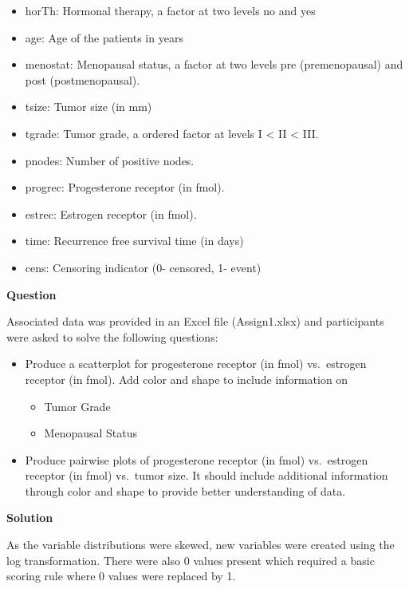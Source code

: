 \begin{itemize}
\tightlist
\item
  horTh: Hormonal therapy, a factor at two levels no and yes
\item
  age: Age of the patients in years
\item
  menostat: Menopausal status, a factor at two levels pre
  (premenopausal) and post (postmenopausal).
\item
  tsize: Tumor size (in mm)
\item
  tgrade: Tumor grade, a ordered factor at levels I \textless{} II
  \textless{} III.
\item
  pnodes: Number of positive nodes.
\item
  progrec: Progesterone receptor (in fmol).
\item
  estrec: Estrogen receptor (in fmol).
\item
  time: Recurrence free survival time (in days)
\item
  cens: Censoring indicator (0- censored, 1- event)
\end{itemize}

\noindent \textbf{Question}

Associated data was provided in an Excel file (Assign1.xlsx) and
participants were asked to solve the following questions:

\begin{itemize}
\tightlist
\item
  Produce a scatterplot for progesterone receptor (in fmol) vs.~estrogen
  receptor (in fmol). Add color and shape to include information on

  \begin{itemize}
  \tightlist
  \item
    Tumor Grade
  \item
    Menopausal Status
  \end{itemize}
\item
  Produce pairwise plots of progesterone receptor (in fmol) vs.~estrogen
  receptor (in fmol) vs.~tumor size. It should include additional
  information through color and shape to provide better understanding of
  data.
\end{itemize}

\noindent \textbf{Solution}

As the variable distributions were skewed, new variables were created
using the log transformation. There were also 0 values present which
required a basic scoring rule where 0 values were replaced by 1.

